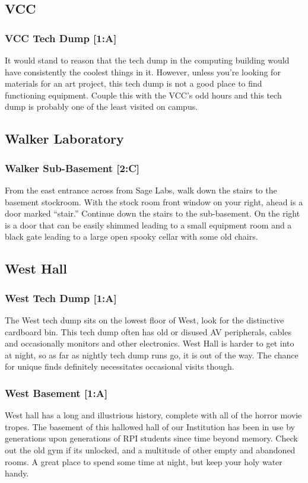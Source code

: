 \documentclass{article}
\begin{document}
\subsection{VCC}
\subsubsection{VCC Tech Dump [1:A]}
It would stand to reason that the tech dump in the computing building would have consistently the coolest things in it. However, unless you’re looking for materials for an art project, this tech dump is not a good place to find functioning equipment. Couple this with the VCC’s odd hours and this tech dump is probably one of the least visited on campus.



\pagebreak
\subsection{Walker Laboratory}
\subsubsection{Walker Sub-Basement [2:C]}
From the east entrance across from Sage Labs, walk down the stairs to the basement stockroom. With the stock room front window on your right, ahead is a door marked “stair.” Continue down the stairs to the sub-basement. On the right is a door that can be easily shimmed leading to a small equipment room and a black gate leading to a large open spooky cellar with some old chairs.



\pagebreak
\subsection{West Hall}
\subsubsection{West Tech Dump [1:A]}
The West tech dump sits on the lowest floor of West, look for the distinctive cardboard bin. This tech dump often has old or disused AV peripherals, cables and occasionally monitors and other electronics. West Hall is harder to get into at night, so as far as nightly tech dump runs go, it is out of the way. The chance for unique finds definitely necessitates occasional visits though.

\subsubsection{West Basement [1:A]}
West hall has a long and illustrious history, complete with all of the horror movie tropes. The basement of this hallowed hall of our Institution has been in use by generations upon generations of RPI students since time beyond memory. Check out the old gym if its unlocked, and a multitude of other empty and abandoned rooms. A great place to spend some time at night, but keep your holy water handy.
\end{document}
